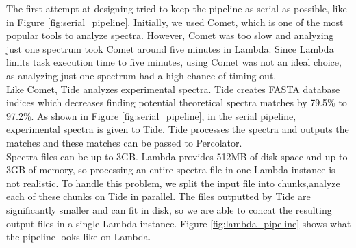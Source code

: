 The first attempt at designing \name tried to keep the pipeline as serial as possible, like in Figure \ref{fig:serial_pipeline}.
Initially, we used Comet, which is one of the most popular tools to analyze spectra\cite{comet}.
However, Comet was too slow and analyzing just one spectrum took Comet around five minutes in Lambda.
Since Lambda limits task execution time to five minutes, using Comet was not an ideal choice, as analyzing just one spectrum had a high chance of timing out.\\
\newline
Like Comet, Tide analyzes experimental spectra.
Tide creates FASTA database indices which decreases finding potential theoretical spectra matches by 79.5\% to 97.2\%\cite{crux}.
As shown in Figure \ref{fig:serial_pipeline}, in the serial pipeline, experimental spectra is given to Tide.
Tide processes the spectra and outputs the matches and these matches can be passed to Percolator.\\
\newline
Spectra files can be up to 3GB. Lambda provides 512MB of disk space and up to 3GB of memory, so processing an entire spectra file in one Lambda instance is not realistic.
To handle this problem, we split the input file into chunks,analyze each of these chunks on Tide in parallel.
The files outputted by Tide are significantly smaller and can fit in disk, so we are able to concat the resulting output files in a single Lambda instance.
Figure \ref{fig:lambda_pipeline} shows what the pipeline looks like on Lambda.
\newline


